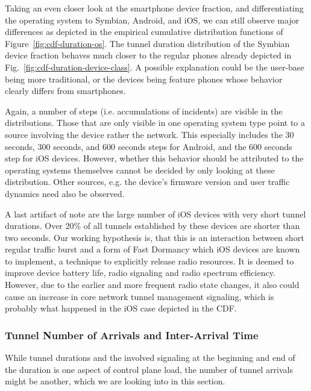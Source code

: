 Taking an even closer look at the smartphone device fraction, and differentiating the operating system to Symbian, Android, and iOS, we can still observe major differences as depicted in the empirical cumulative distribution functions of Figure~\ref{fig:cdf-duration-os}. The tunnel duration distribution of the Symbian device fraction behaves much closer to the regular phones already depicted in Fig.~\ref{fig:cdf-duration-device-class}. A possible explanation could be the user-base being more traditional, or the devices being feature phones whose behavior clearly differs from smartphones.

Again, a number of steps (i.e. accumulations of incidents) are visible in the distributions. Those that are only visible in one operating system type point to a source involving the device rather the network. This especially includes the 30 seconds, 300 seconds, and 600 seconds steps for Android, and the 600 seconds step for iOS devices. However, whether this behavior should be attributed to the operating systems themselves cannot be decided by only looking at these distribution. Other sources, e.g. the device's firmware version and user traffic dynamics need also be observed.

A last artifact of note are the large number of iOS devices with very short tunnel durations. Over 20\% of all tunnels established by these devices are shorter than two seconds. Our working hypothesis is, that this is an interaction between short regular traffic burst and a form of Fast Dormancy \cite{gsma2011fdbestpract} which iOS devices are known to implement, a technique to explicitly release radio resources. It is deemed to improve device battery life, radio signaling and radio spectrum efficiency. However, due to the earlier and more frequent radio state changes, it also could cause an increase in core network tunnel management signaling, which is probably what happened in the iOS case depicted in the CDF.



\subsubsection{Tunnel Number of Arrivals and Inter-Arrival Time}

While tunnel durations and the involved signaling at the beginning and end of the duration is one aspect of control plane load, the number of tunnel arrivals might be another, which we are looking into in this section.

